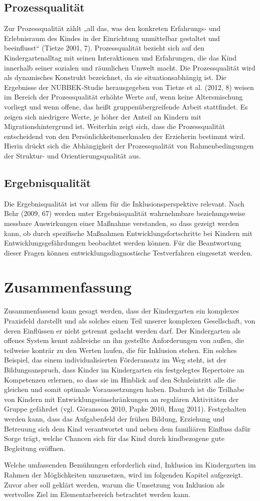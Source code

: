 \subsection{Prozessqualität}
Zur Prozessqualität zählt „all das, was den konkreten Erfahrungs- und Erlebnisraum des Kindes in der Einrichtung unmittelbar gestaltet und beeinflusst“ (Tietze 2001, 7). Prozessqualität bezieht sich auf den Kindergartenalltag mit seinen Interaktionen und Erfahrungen, die das Kind innerhalb seiner sozialen und räumlichen Umwelt macht. Die Prozessqualität wird als dynamisches Konstrukt bezeichnet, da sie situationsabhängig ist. Die Ergebnisse der NUBBEK-Studie herausgegeben von Tietze et al. (2012, 8) weisen im Bereich der Prozessqualität erhöhte Werte auf, wenn keine Altersmischung vorliegt und wenn offene, das heißt gruppenübergreifende Arbeit stattfindet. Es zeigen sich niedrigere Werte, je höher der Anteil an Kindern mit Migrationshintergrund ist. Weiterhin zeigt sich, dass die Prozessqualität entscheidend von den Persönlichkeitsmerkmalen der Erzieherin bestimmt wird. Hierin drückt sich die Abhängigkeit der Prozessqualität von Rahmenbedingungen der Struktur- und Orientierungsqualität aus.   

\subsection{Ergebnisqualität}
Die Ergebnisqualität ist vor allem für die Inklusionsperspektive relevant. Nach Behr (2009, 67) werden unter Ergebnisqualität  wahrnehmbare beziehungsweise messbare Auswirkungen einer Maßnahme verstanden, so dass gezeigt werden kann, ob durch spezifische Maßnahmen Entwicklungsfortschritte bei Kindern mit Entwicklungsgefährdungen beobachtet werden können. Für die Beantwortung dieser Fragen können entwicklungsdiagnostische Testverfahren eingesetzt werden.


\section{Zusammenfassung}

Zusammenfassend kann gesagt werden, dass der Kindergarten ein komplexes Praxisfeld darstellt und als solches einen Teil unserer komplexen Gesellschaft, von deren Einflüssen er nicht getrennt gedacht werden darf. Der Kindergarten als offenes System kennt zahlreiche an ihn gestellte Anforderungen von außen, die teilweise konträr zu den Werten laufen, die für Inklusion stehen. 
Ein solches Beispiel, das einem individualisierten Förderansatz im Weg steht, ist der Bildungsanspruch, dass Kinder im Kindergarten ein festgelegtes Repertoire an Kompetenzen erlernen, so dass sie im Hinblick auf den Schuleintritt alle die gleichen und somit optimale Voraussetzungen haben. Dadurch ist die Teilhabe von Kindern mit Entwicklungseinschränkungen an regulären Aktivitäten der Gruppe gefährdet (vgl. Göransson 2010, Papke 2010, Haug 2011). Festgehalten werden kann, dass das Aufgabenfeld der frühen Bildung, Erziehung und Betreuung sich dem Kind verantwortet und neben dem familiären Einfluss dafür Sorge trägt, welche Chancen sich für das Kind durch kindbezogene gute Begleitung eröffnen.

Welche umfassenden Bemühungen erforderlich sind, Inklusion im Kindergarten im Rahmen der Möglichkeiten umzusetzen, wird im folgenden Kapitel aufgezeigt. Zuvor aber soll geklärt werden, warum die Umsetzung von Inklusion als wertvolles Ziel im Elementarbereich betrachtet werden kann.
